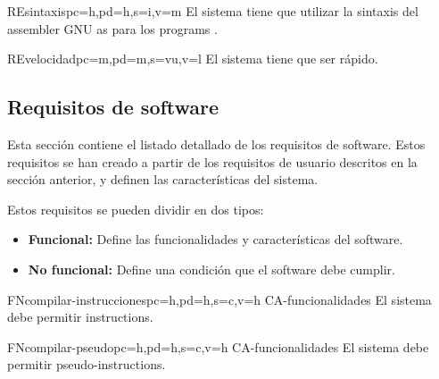 \begin{userReq}{RE}{sintaxis}{pc=h,pd=h,s=i,v=m}
    El sistema tiene que utilizar la sintaxis del \gls{assembler} GNU as
    \parencite{as-manual} para los \glspl{program} .
\end{userReq}

\begin{userReq}{RE}{velocidad}{pc=m,pd=m,s=vu,v=l}
    El sistema tiene que ser rápido. %
\end{userReq}

\FloatBarrier


\subsection{Requisitos de software}\label{subsec:software-requirements}

Esta sección contiene el listado detallado de los requisitos de software. Estos
requisitos se han creado a partir de los requisitos de usuario descritos en la
sección anterior, y definen las características del sistema.

\noindent
Estos requisitos se pueden dividir en dos tipos:

\begin{itemize}
    \item \textbf{Funcional:} Define las funcionalidades y características del
    software.
    \item \textbf{No funcional:} Define una condición que el software debe cumplir.
\end{itemize}

\printsreqtemplate


\begin{softwareReq}{FN}{compilar-instrucciones}{pc=h,pd=h,s=c,v=h}
    {CA-funcionalidades}
    El sistema debe permitir  \glspl{instruction}.
\end{softwareReq}

\begin{softwareReq}{FN}{compilar-pseudo}{pc=h,pd=h,s=c,v=h}
    {CA-funcionalidades}
    El sistema debe permitir  \glspl{pseudo-instruction}.
\end{softwareReq}

